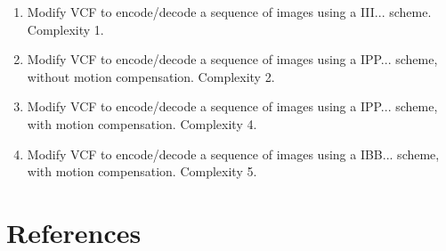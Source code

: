 \begin{enumerate}
\item Modify VCF to encode/decode a sequence of images using a
  III... scheme. Complexity 1.
\item Modify VCF to encode/decode a sequence of images using a
  IPP... scheme, without motion compensation. Complexity 2.
\item Modify VCF to encode/decode a sequence of images using a
  IPP... scheme, with motion compensation. Complexity 4.
\item Modify VCF to encode/decode a sequence of images using a
  IBB... scheme, with motion compensation. Complexity 5.
\end{enumerate}

  
\section{References}

\renewcommand{\addcontentsline}[3]{}%


